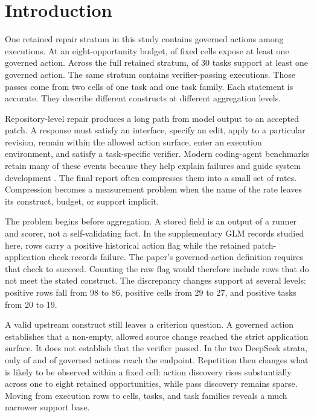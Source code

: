 \section{Introduction}
\label{sec:introduction}

One retained repair stratum in this study contains \ExtensionActions{} governed actions among \ExtensionRows{} executions. At an eight-opportunity budget, \ExtensionActionCells{} of \ExtensionCells{} fixed cells expose at least one governed action. Across the full retained stratum, \ExtensionActionTasks{} of 30 tasks support at least one governed action. The same stratum contains \ExtensionPasses{} verifier-passing executions. Those passes come from two cells of one task and one task family. Each statement is accurate. They describe different constructs at different aggregation levels.

Repository-level repair produces a long path from model output to an accepted patch. A response must satisfy an interface, specify an edit, apply to a particular revision, remain within the allowed action surface, enter an execution environment, and satisfy a task-specific verifier. Modern coding-agent benchmarks retain many of these events because they help explain failures and guide system development \citep{jimenez2024swebench,yang2024sweagent,xia2024agentless,xu2026roadmapbench}. The final report often compresses them into a small set of rates. Compression becomes a measurement problem when the name of the rate leaves its construct, budget, or support implicit.

The problem begins before aggregation. A stored field is an output of a runner and scorer, not a self-validating fact. In the supplementary GLM records studied here, \ContradictionRows{} rows carry a positive historical action flag while the retained patch-application check records failure. The paper's governed-action definition requires that check to succeed. Counting the raw flag would therefore include rows that do not meet the stated construct. The discrepancy changes support at several levels: positive rows fall from 98 to 86, positive cells from 29 to 27, and positive tasks from 20 to 19.

A valid upstream construct still leaves a criterion question. A governed action establishes that a non-empty, allowed source change reached the strict application surface. It does not establish that the verifier passed. In the two DeepSeek strata, only \CleanPasses{} of \CleanActions{} and \ExtensionPasses{} of \ExtensionActions{} governed actions reach the endpoint. Repetition then changes what is likely to be observed within a fixed cell: action discovery rises substantially across one to eight retained opportunities, while pass discovery remains sparse. Moving from execution rows to cells, tasks, and task families reveals a much narrower support base.

